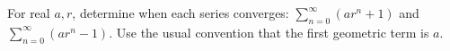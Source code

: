 For real $a,r$, determine when each series converges: $\sum_{n=0}^{\infty}(ar^n+1)$ and $\sum_{n=0}^{\infty}(ar^n-1)$. Use the usual convention that the first geometric term is $a$.
